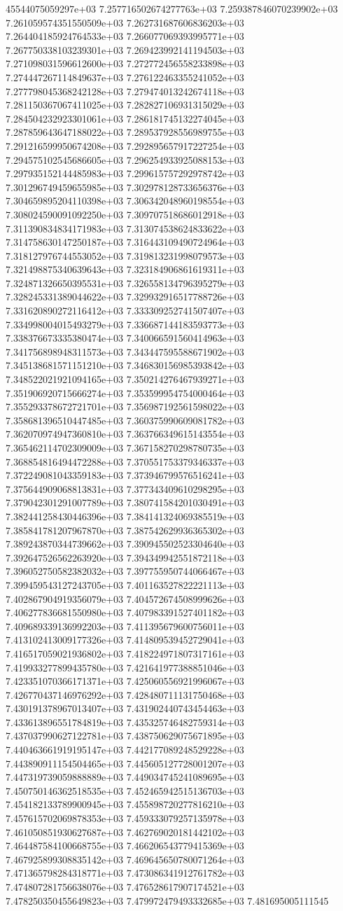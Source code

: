 45544075059297e+03	7.257716502674277763e+03	7.259387846070239902e+03	7.261059574351550509e+03	7.262731687606836203e+03	7.264404185924764533e+03	7.266077069393995771e+03	7.267750338103239301e+03	7.269423992141194503e+03	7.271098031596612600e+03	7.272772456558233898e+03	7.274447267114849637e+03	7.276122463355241052e+03	7.277798045368242128e+03	7.279474013242674118e+03	7.281150367067411025e+03	7.282827106931315029e+03	7.284504232923301061e+03	7.286181745132274045e+03	7.287859643647188022e+03	7.289537928556989755e+03	7.291216599950674208e+03	7.292895657917227254e+03	7.294575102545686605e+03	7.296254933925088153e+03	7.297935152144485983e+03	7.299615757292978742e+03	7.301296749459655985e+03	7.302978128733656376e+03	7.304659895204110398e+03	7.306342048960198554e+03	7.308024590091092250e+03	7.309707518686012918e+03	7.311390834834171983e+03	7.313074538624833622e+03	7.314758630147250187e+03	7.316443109490724964e+03	7.318127976744553052e+03	7.319813231998079573e+03	7.321498875340639643e+03	7.323184906861619311e+03	7.324871326650395531e+03	7.326558134796395279e+03	7.328245331389044622e+03	7.329932916517788726e+03	7.331620890272116412e+03	7.333309252741507407e+03	7.334998004015493279e+03	7.336687144183593773e+03	7.338376673335380474e+03	7.340066591560414963e+03	7.341756898948311573e+03	7.343447595588671902e+03	7.345138681571151210e+03	7.346830156985393842e+03	7.348522021921094165e+03	7.350214276467939271e+03	7.351906920715666274e+03	7.353599954754000464e+03	7.355293378672721701e+03	7.356987192561598022e+03	7.358681396510447485e+03	7.360375990609081782e+03	7.362070974947360810e+03	7.363766349615143554e+03	7.365462114702309009e+03	7.367158270298780735e+03	7.368854816494472288e+03	7.370551753379346337e+03	7.372249081043359183e+03	7.373946799576516241e+03	7.375644909068813831e+03	7.377343409610298295e+03	7.379042301291007789e+03	7.380741584201030491e+03	7.382441258430446396e+03	7.384141324069385519e+03	7.385841781207967870e+03	7.387542629936365302e+03	7.389243870344739662e+03	7.390945502523304640e+03	7.392647526562263920e+03	7.394349942551872118e+03	7.396052750582382032e+03	7.397755950744066467e+03	7.399459543127243705e+03	7.401163527822221113e+03	7.402867904919356079e+03	7.404572674508999626e+03	7.406277836681550980e+03	7.407983391527401182e+03	7.409689339136992203e+03	7.411395679600756011e+03	7.413102413009177326e+03	7.414809539452729041e+03	7.416517059021936802e+03	7.418224971807317161e+03	7.419933277899435780e+03	7.421641977388851046e+03	7.423351070366171371e+03	7.425060556921996067e+03	7.426770437146976292e+03	7.428480711131750468e+03	7.430191378967013407e+03	7.431902440743454463e+03	7.433613896551784819e+03	7.435325746482759314e+03	7.437037990627122781e+03	7.438750629075671895e+03	7.440463661919195147e+03	7.442177089248529228e+03	7.443890911154504465e+03	7.445605127728001207e+03	7.447319739059888889e+03	7.449034745241089695e+03	7.450750146362518535e+03	7.452465942515136703e+03	7.454182133789900945e+03	7.455898720277816210e+03	7.457615702069878353e+03	7.459333079257135978e+03	7.461050851930627687e+03	7.462769020181442102e+03	7.464487584100668755e+03	7.466206543779415369e+03	7.467925899308835142e+03	7.469645650780071264e+03	7.471365798284318771e+03	7.473086341912761782e+03	7.474807281756638076e+03	7.476528617907174521e+03	7.478250350455649823e+03	7.479972479493332685e+03	7.481695005111545